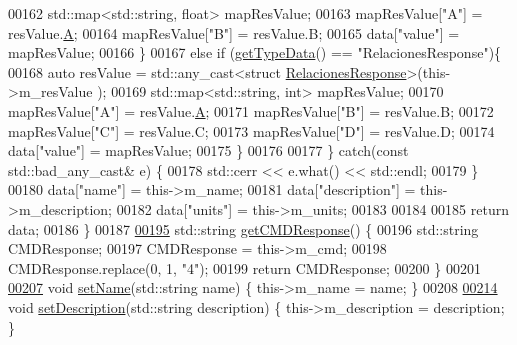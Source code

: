 \begin{DoxyCode}
00162                 std::map<std::string, float> mapResValue;
00163                 mapResValue[\textcolor{stringliteral}{"A"}] = resValue.\hyperlink{structOxigenoResponse_a068c403e5746226cf22bb020b4c786d3}{A};
00164                 mapResValue[\textcolor{stringliteral}{"B"}] = resValue.B;
00165                 data[\textcolor{stringliteral}{"value"}] = mapResValue;
00166             \}
00167             \textcolor{keywordflow}{else} \textcolor{keywordflow}{if} (\hyperlink{classCommands_a7d983e153465d335db0b3ad7724b8ef6}{getTypeData}() == \textcolor{stringliteral}{"RelacionesResponse"})\{
00168                 \textcolor{keyword}{auto} resValue = std::any\_cast<\textcolor{keyword}{struct }\hyperlink{structRelacionesResponse}{RelacionesResponse}>(this->m\_resValue
      );
00169                 std::map<std::string, int> mapResValue;
00170                 mapResValue[\textcolor{stringliteral}{"A"}] = resValue.\hyperlink{structRelacionesResponse_a560d1e6af01b999625b467ef3f858181}{A};
00171                 mapResValue[\textcolor{stringliteral}{"B"}] = resValue.B;
00172                 mapResValue[\textcolor{stringliteral}{"C"}] = resValue.C;
00173                 mapResValue[\textcolor{stringliteral}{"D"}] = resValue.D;
00174                 data[\textcolor{stringliteral}{"value"}] = mapResValue;
00175             \}
00176 
00177         \} \textcolor{keywordflow}{catch}(\textcolor{keyword}{const} std::bad\_any\_cast& e) \{
00178             std::cerr << e.what() << std::endl;
00179         \}
00180         data[\textcolor{stringliteral}{"name"}] = this->m\_name;
00181         data[\textcolor{stringliteral}{"description"}] = this->m\_description;
00182         data[\textcolor{stringliteral}{"units"}] = this->m\_units;
00183         
00184 
00185         \textcolor{keywordflow}{return} data;
00186     \}
00187 
\hyperlink{classCommands_ab4806a2fda5c80e10ab4446faa1e39b5}{00195}     std::string \hyperlink{classCommands_ab4806a2fda5c80e10ab4446faa1e39b5}{getCMDResponse}() \{
00196         std::string CMDResponse;
00197         CMDResponse = this->m\_cmd;
00198         CMDResponse.replace(0, 1, \textcolor{stringliteral}{"4"});
00199         \textcolor{keywordflow}{return} CMDResponse;
00200     \}
00201 
\hyperlink{classCommands_a8fd31a6ed848078dd67bf7ae303cfb9b}{00207}     \textcolor{keywordtype}{void} \hyperlink{classCommands_a8fd31a6ed848078dd67bf7ae303cfb9b}{setName}(std::string name) \{ this->m\_name = name; \}
00208 
\hyperlink{classCommands_aa430824877071f732b1a9aa9ff1bbf94}{00214}     \textcolor{keywordtype}{void} \hyperlink{classCommands_aa430824877071f732b1a9aa9ff1bbf94}{setDescription}(std::string description) \{ this->m\_description = description; \}

\end{DoxyCode}

